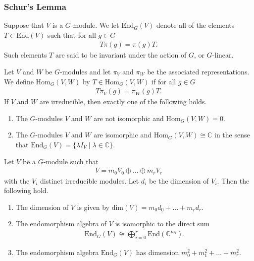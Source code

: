 \subsubsection{Schur's Lemma}

Suppose that $V$ is a $G$-module. 
We let $\mathrm{End}_G(V)$ denote all of the elements $T \in \mathrm{End}(V)$ such that for all $g \in G$
\begin{align}
    T \pi(g) = \pi(g)T.
\end{align}
Such elements $T$ are said to be invariant under the action of $G$, or $G$-linear.

\begin{lemma}\label{lem:schurs-lemma}
    Let $V$ and $W$ be $G$-modules and let $\pi_V$ and $\pi_W$ be the associated representations.
    We define $\mathrm{Hom}_G(V, W)$ by $T \in \mathrm{Hom}_G(V, W)$ if for all $g \in G$
    \begin{align}
        T \pi_V(g) = \pi_W(g) T.
    \end{align}
    If $V$ and $W$ are irreducible, then exactly one of the following holds.
    \begin{enumerate}
        \item The $G$-modules $V$ and $W$ are not isomorphic and $\mathrm{Hom}_G(V,W) = 0$.
        \item The $G$-modules $V$ and $W$ are isomorphic and $\mathrm{Hom}_G(V,W) \cong \mathbb{C}$ in the sense that $\mathrm{End}_G(V) = \{ \lambda I_V \mid \lambda \in \mathbb{C} \}$.
    \end{enumerate}
\end{lemma}

\begin{cor}\label{cor:schur-decomposition}
    Let $V$ be a $G$-module such that
    \begin{align}
        V = m_0 V_0 \oplus \dots \oplus m_r V_r
    \end{align}
    with the $V_i$ distinct irreducible modules.
    Let $d_i$ be the dimension of $V_i$.
    Then the following hold.
    \begin{enumerate}
        \item The dimension of $V$ is given by $\mathrm{dim}(V) = m_0 d_0 + \dots + m_r d_r$.
        \item \label{item:artin-wedderburn} The endomorphism algebra of $V$ is isomorphic to the direct sum
        \begin{align}
            \mathrm{End}_G(V) \cong \bigoplus_{i = 0}^r \mathrm{End}(\mathbb{C}^{m_i}).
        \end{align}
        \item The endomorphism algebra $\mathrm{End}_G(V)$ has dimension $m_0^2 + m_1^2 + \dots + m_r^2$.
    \end{enumerate}
\end{cor}


